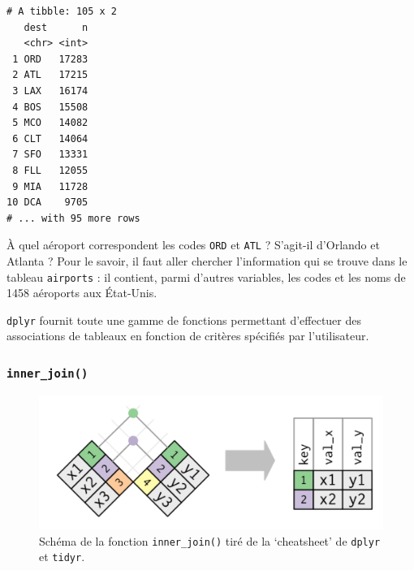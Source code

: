 \documentclass[
  a4paper,
]{article}
\newenvironment{Shaded}{\begin{snugshade}}{\end{snugshade}}
\newcommand{\KeywordTok}[1]{\textcolor[rgb]{0.12,0.11,0.11}{\textbf{#1}}}
\newcommand{\NormalTok}[1]{\textcolor[rgb]{0.12,0.11,0.11}{#1}}
\newcommand{\OperatorTok}[1]{\textcolor[rgb]{0.12,0.11,0.11}{#1}}
\newcommand{\StringTok}[1]{\textcolor[rgb]{0.75,0.01,0.01}{#1}}
\begin{document}
\begin{Shaded}
\end{Shaded}

\begin{verbatim}
# A tibble: 105 x 2
   dest      n
   <chr> <int>
 1 ORD   17283
 2 ATL   17215
 3 LAX   16174
 4 BOS   15508
 5 MCO   14082
 6 CLT   14064
 7 SFO   13331
 8 FLL   12055
 9 MIA   11728
10 DCA    9705
# ... with 95 more rows
\end{verbatim}

À quel aéroport correspondent les codes \texttt{ORD} et \texttt{ATL} ? S'agit-il d'Orlando et Atlanta ? Pour le savoir, il faut aller chercher l'information qui se trouve dans le tableau \texttt{airports} : il contient, parmi d'autres variables, les codes et les noms de 1458 aéroports aux État-Unis.

\texttt{dplyr} fournit toute une gamme de fonctions permettant d'effectuer des associations de tableaux en fonction de critères spécifiés par l'utilisateur.

\hypertarget{inner_join}{%
\subsubsection{\texorpdfstring{\texttt{inner\_join()}}{inner\_join()}}\label{inner_join}}

\begin{figure}[htpb]

{\centering \includegraphics[width=0.5\linewidth]{images/innerjoin} 

}

\caption{Schéma de la fonction \texttt{inner\_join()} tiré de la `cheatsheet' de \texttt{dplyr} et \texttt{tidyr}.}\label{fig:inner}
\end{figure}
\end{document}

